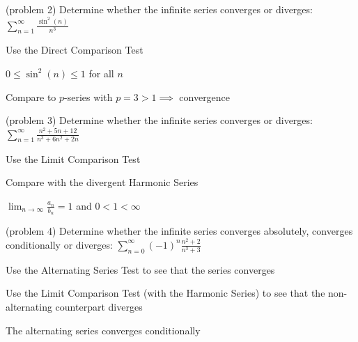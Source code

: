 \documentclass[handout]{ximera}
\begin{document}
\begin{problem}(problem 2)
Determine whether the infinite series converges or diverges: 
$\displaystyle \sum_{n=1}^\infty \frac{\sin^2(n)}{n^3}$

\begin{hint}
Use the Direct Comparison Test
\end{hint}

\begin{hint}
$\displaystyle 0 \leq \sin^2(n) \leq 1$ for all $n$
\end{hint}

\begin{hint}
Compare to $p$-series with $p = 3 > 1 \implies$ convergence
\end{hint}

\end{problem}

\begin{problem}(problem 3)
Determine whether the infinite series converges or diverges: 
$\displaystyle \sum_{n=1}^\infty \frac{n^2 + 5n + 12}{n^3 + 6n^2 + 2n}$
\begin{hint}
Use the Limit Comparison Test 
\end{hint}

\begin{hint}
Compare with the divergent Harmonic Series 
\end{hint}

\begin{hint}
$\displaystyle \lim_{n \to \infty} \frac{a_n}{b_n} = 1$ and $ 0 < 1 < \infty$
\end{hint}

\end{problem}

\begin{problem}(problem 4)
Determine whether the infinite series converges absolutely, converges conditionally or diverges: $\displaystyle \sum_{n=0}^\infty (-1)^n \frac{n^2 + 2}{n^3 + 3}$

\begin{hint}
Use the Alternating Series Test to see that the series converges
\end{hint}

\begin{hint}
Use the Limit Comparison Test (with the Harmonic Series) to see that the 
non-alternating counterpart diverges
\end{hint}

\begin{hint}
The alternating series converges conditionally
\end{hint}

\end{problem}
\end{document}
